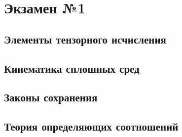 \documentclass[../mss.tex]{subfiles}
\begin{document}
\part{Экзамен №1}
\chapter{Элементы тензорного исчисления}








\chapter{Кинематика сплошных сред}








\chapter{Законы сохранения}















\chapter{Теория определяющих соотношений}











\end{document}
